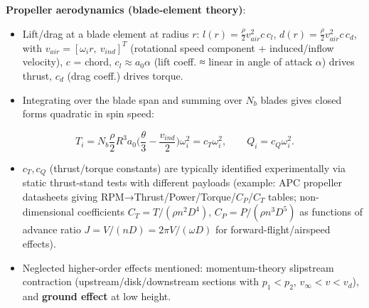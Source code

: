 \documentclass[11pt]{article}
\begin{document}
\textbf{Propeller aerodynamics (blade-element theory)}:
\begin{itemize}
\item Lift/drag at a blade element at radius $r$: $l(r)=\tfrac{\rho}{2}v_{air}^2 c\,c_l$, $d(r)=\tfrac{\rho}{2}v_{air}^2c\,c_d$, with $v_{air}=[\omega_i r,\ v_{ind}]^T$ (rotational speed component + induced/inflow velocity), $c$ = chord, $c_l\approx a_0\alpha$ (lift coeff. ≈ linear in angle of attack $\alpha$) drives thrust, $c_d$ (drag coeff.) drives torque.
\item Integrating over the blade span and summing over $N_b$ blades gives closed forms quadratic in spin speed:
\end{itemize}
\[T_i = N_b\frac{\rho}{2}R^3a_0\Big(\frac{\theta}{3}-\frac{v_{ind}}{2}\Big)\omega_i^2 = c_T\omega_i^2,\qquad Q_i = c_Q\omega_i^2.\]
\begin{itemize}
\item $c_T,c_Q$ (thrust/torque constants) are typically identified experimentally via static thrust-stand tests with different payloads (example: APC propeller datasheets giving RPM→Thrust/Power/Torque/$C_P$/$C_T$ tables; non-dimensional coefficients $C_T=T/(\rho n^2D^4)$, $C_P=P/(\rho n^3D^5)$ as functions of advance ratio $J=V/(nD)=2\pi V/(\omega D)$ for forward-flight/airspeed effects).
\item Neglected higher-order effects mentioned: momentum-theory slipstream contraction (upstream/disk/downstream sections with $p_1<p_2$, $v_\infty<v<v_d$), and \textbf{ground effect} at low height.
\end{itemize}
\end{document}
